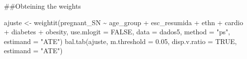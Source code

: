\documentclass[
]{article}
\newenvironment{Shaded}{\begin{snugshade}}{\end{snugshade}}
\newcommand{\AttributeTok}[1]{\textcolor[rgb]{0.77,0.63,0.00}{#1}}
\newcommand{\ConstantTok}[1]{\textcolor[rgb]{0.00,0.00,0.00}{#1}}
\newcommand{\FloatTok}[1]{\textcolor[rgb]{0.00,0.00,0.81}{#1}}
\newcommand{\FunctionTok}[1]{\textcolor[rgb]{0.00,0.00,0.00}{#1}}
\newcommand{\NormalTok}[1]{#1}
\newcommand{\OtherTok}[1]{\textcolor[rgb]{0.56,0.35,0.01}{#1}}
\newcommand{\SpecialCharTok}[1]{\textcolor[rgb]{0.00,0.00,0.00}{#1}}
\newcommand{\StringTok}[1]{\textcolor[rgb]{0.31,0.60,0.02}{#1}}
\begin{document}
\#\#Obteining the weights

\begin{Shaded}
\begin{Highlighting}[]
\NormalTok{ajuste }\OtherTok{\textless{}{-}} \FunctionTok{weightit}\NormalTok{(pregnant\_SN }\SpecialCharTok{\textasciitilde{}}\NormalTok{ age\_group }\SpecialCharTok{+}\NormalTok{ esc\_resumida }\SpecialCharTok{+}\NormalTok{ ethn }\SpecialCharTok{+}\NormalTok{ cardio }\SpecialCharTok{+}\NormalTok{ diabetes }\SpecialCharTok{+}\NormalTok{ obesity, }
                   \AttributeTok{use.mlogit =} \ConstantTok{FALSE}\NormalTok{, }\AttributeTok{data =}\NormalTok{ dados5, }\AttributeTok{method =} \StringTok{"ps"}\NormalTok{, }\AttributeTok{estimand =} \StringTok{"ATE"}\NormalTok{)}
\FunctionTok{bal.tab}\NormalTok{(ajuste, }\AttributeTok{m.threshold =} \FloatTok{0.05}\NormalTok{, }\AttributeTok{disp.v.ratio =} \ConstantTok{TRUE}\NormalTok{, }\AttributeTok{estimand =} \StringTok{"ATE"}\NormalTok{)}
\end{Highlighting}
\end{Shaded}
\end{document}
